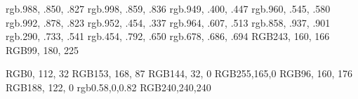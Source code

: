 
\definecolor{bgred}    {rgb}{.988, .850, .827}
\definecolor{bgred1}   {rgb}{.998, .859, .836}
\definecolor{rured}    {rgb}{.949, .400, .447}
\definecolor{lired}    {rgb}{.960, .545, .580}
\definecolor{bgorange} {rgb}{.992, .878, .823}
\definecolor{ruorange} {rgb}{.952, .454, .337}
\definecolor{liorange} {rgb}{.964, .607, .513}
\definecolor{bggreen}  {rgb}{.858, .937, .901}
\definecolor{rugreen}  {rgb}{.290, .733, .541}
\definecolor{ligreen}  {rgb}{.454, .792, .650}
\definecolor{ligray}   {rgb}{.678, .686, .694}
\definecolor{tired}    {RGB}{243, 160, 166}
\definecolor{tiblue}   {RGB}{99, 180, 225}

\definecolor{lstkeyword}  {RGB}{0, 112, 32}
\definecolor{lstkeywordG} {RGB}{153, 168, 87}
\definecolor{lstkeywordR} {RGB}{144, 32, 0}
\definecolor{lstkeywordO} {RGB}{255,165,0}
\definecolor{lstcomment}  {RGB}{96, 160, 176}
\definecolor{lstnumber}   {RGB}{188, 122, 0}
\definecolor{lststring}   {rgb}{0.58,0,0.82}
\definecolor{lstbg}       {RGB}{240,240,240}
